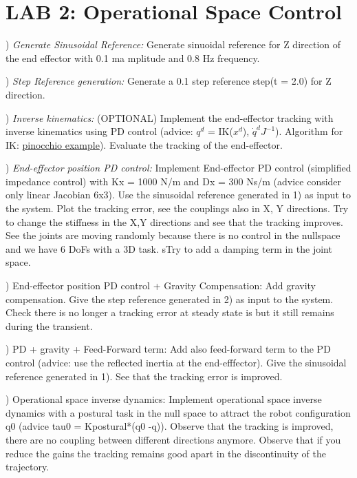 \documentclass{report}
\begin{document}
\section*{LAB 2: Operational Space Control	}

\quad

) \textit{Generate Sinusoidal Reference:}
Generate sinuoidal reference for Z direction of the end effector with 0.1 ma mplitude and 0.8 Hz frequency.

\quad

) \textit{Step Reference generation:}
Generate a 0.1 step reference step(t = 2.0) for Z direction.

\quad

) \textit{Inverse kinematics:} (OPTIONAL) Implement the end-effector tracking with inverse kinematics using PD control (advice: $q^d$ = IK($x^d$), $\dot{q}^d  J^{-1}$). Algorithm for IK: \href{https://gepettoweb.laas.fr/doc/stack-of-tasks/pinocchio/master/doxygen-html/md_doc_b-examples_i-inverse-kinematics.html}{pinocchio example}). Evaluate the tracking of the end-effector.

\quad

)\textit{ End-effector position  PD control:}
Implement End-effector PD control (simplified impedance control) with Kx = 1000 N/m and Dx = 300 Ns/m (advice consider only linear Jacobian 6x3). Use the sinusoidal reference generated in 1) as input to the system. Plot the tracking error, see the couplings also in X, Y directions. Try to change the stiffness in the X,Y directions and see that the tracking improves. See the joints are moving randomly because there is no control in the nullspace and we have 6 DoFs with a 3D task. sTry to add a damping term in the joint space.

\quad

)  End-effector position  PD control + Gravity Compensation:
Add gravity compensation. Give the step reference generated in 2) as input to the system. Check there is no longer a  tracking error at steady state is  but it still remains during the transient. 

\quad

) PD + gravity + Feed-Forward term:
Add also feed-forward term to the PD control (advice: use the reflected inertia at the end-efffector). Give the sinusoidal reference generated in 1). See that the tracking error is improved. 

\quad

) Operational space inverse dynamics:
Implement operational space inverse dynamics with a postural task in the null space to attract the robot configuration q0 (advice tau0 = Kpostural*(q0 -q)).  Observe that the tracking is improved, there are no coupling between different directions anymore.  Observe that if you reduce the gains the tracking remains good apart in the discontinuity of the trajectory.  
\end{document}
